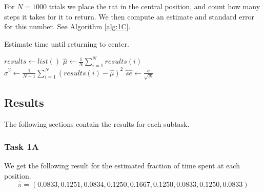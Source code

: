 For $N=1000$ trials we place the rat in the central position, and count how many steps it takes for it to return. We then compute an estimate and standard error for this number. 
See Algorithm \ref{alg:1C}.

\begin{algorithm}[H]
    \label{alg:1C}
    \caption{Estimate time until returning to center.}
    $results \gets list()$ 
    $\hat{\mu} \gets \frac{1}{N} \sum^{N}_{i=1} results(i)$ 
    $\hat{\sigma}^2 \gets \frac{1}{N-1} \sum^{N}_{i=1} (results(i)-\hat{\mu})^2$ 
    $\hat{se} \gets \frac{\hat{\sigma}}{\sqrt{N}}$ 
\end{algorithm}



\subsection{Results}
\label{sec:res1}
The following sections contain the results for each subtask.

\subsubsection{Task 1A}

We get the following result for the estimated fraction of time spent at each position.
$$\hat{\pi} = (0.0833,    0.1251,    0.0834,    0.1250,    0.1667,    0.1250,    0.0833 ,   0.1250,    0.0833 )$$

